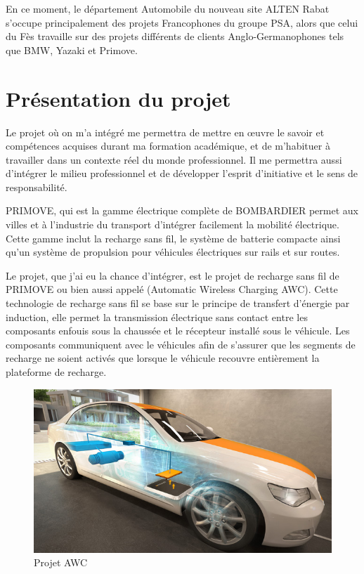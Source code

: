 En ce moment, le département Automobile du nouveau site ALTEN Rabat s’occupe principalement des projets Francophones du groupe PSA, alors que celui du Fès travaille sur des projets différents de clients Anglo-Germanophones tels que BMW, Yazaki et Primove.

\section{Présentation du projet}

Le projet où on m’a intégré me permettra de mettre en œuvre le savoir et compétences acquises durant ma formation académique, et de m’habituer à travailler dans un contexte réel du monde professionnel. Il me permettra aussi d’intégrer le milieu professionnel et de développer l’esprit d’initiative et le sens de responsabilité.

PRIMOVE, qui est la gamme électrique complète de BOMBARDIER permet aux villes et à l’industrie du transport d’intégrer facilement la mobilité électrique. Cette gamme inclut la recharge sans fil, le système de batterie compacte ainsi qu’un système de propulsion pour véhicules électriques sur rails et sur routes.

Le projet, que j’ai eu la chance d’intégrer, est le projet de recharge sans fil de PRIMOVE ou bien aussi appelé (Automatic Wireless Charging AWC). Cette technologie de recharge sans fil se base sur le principe de transfert d’énergie par induction, elle permet la transmission électrique sans contact entre les composants enfouis sous la chaussée et le récepteur installé sous le véhicule. Les composants communiquent avec le véhicules afin de s’assurer que les segments de recharge ne soient activés que lorsque le véhicule recouvre entièrement la plateforme de recharge.

\begin{figure}[H]
 \centering
 \includegraphics[scale=1.2]{images/awc_image_intro}
 \caption{Projet AWC}
\end{figure}

